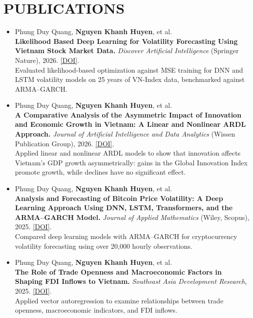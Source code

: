 \documentclass[letterpaper,10pt]{article}
\begin{document}
\section{PUBLICATIONS}

\begin{itemize}

\item Phung Duy Quang,
\textbf{Nguyen Khanh Huyen}, et al.\\[2pt]
\textbf{Likelihood Based Deep Learning for
Volatility Forecasting Using Vietnam Stock
Market Data.}
\textit{Discover Artificial Intelligence}
(Springer Nature), 2026.
\href{https://doi.org/10.1007/s44163-026-02837-1}
{[DOI]}.\\[2pt]
Evaluated likelihood-based optimization against
MSE training for DNN and LSTM volatility models
on 25 years of VN-Index data, benchmarked
against ARMA--GARCH.

\vspace{4pt}

\item Phung Duy Quang,
\textbf{Nguyen Khanh Huyen}, et al.\\[2pt]
\textbf{A Comparative Analysis of the Asymmetric
Impact of Innovation and Economic Growth in
Vietnam: A Linear and Nonlinear ARDL Approach.}
\textit{Journal of Artificial Intelligence and
Data Analytics} (Wissen Publication Group), 2026.
\href{https://doi.org/10.67927/JAIDataAnalytics/2026(1)113}
{[DOI]}.\\[2pt]
Applied linear and nonlinear ARDL models to show
that innovation affects Vietnam's GDP growth
asymmetrically: gains in the Global Innovation
Index promote growth, while declines have no
significant effect.

\vspace{4pt}

\item Phung Duy Quang,
\textbf{Nguyen Khanh Huyen}, et al.\\[2pt]
\textbf{Analysis and Forecasting of Bitcoin
Price Volatility: A Deep Learning Approach
Using DNN, LSTM, Transformers, and the
ARMA--GARCH Model.}
\textit{Journal of Applied Mathematics}
(Wiley, Scopus), 2025.
\href{https://doi.org/10.1155/jama/9089827}
{[DOI]}.\\[2pt]
Compared deep learning models with
ARMA--GARCH for cryptocurrency volatility
forecasting using over 20,000 hourly observations.

\vspace{4pt}

\item Phung Duy Quang,
\textbf{Nguyen Khanh Huyen}, et al.\\[2pt]
\textbf{The Role of Trade Openness and
Macroeconomic Factors in Shaping FDI
Inflows to Vietnam.}
\textit{Southeast Asia Development Research},
2025.
\href{https://doi.org/10.63385/sadr.v1i1.244}
{[DOI]}.\\[2pt]
Applied vector autoregression to examine
relationships between trade openness,
macroeconomic indicators, and FDI inflows.
\end{itemize}
\end{document}
